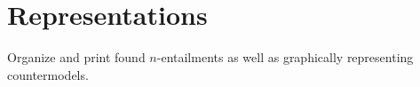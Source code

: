 \documentclass[a4paper, 11pt]{article} %
\newcommand{\tuple}[1]{\langle#1\rangle} %
\newcommand{\set}[1]{\lbrace#1\rbrace} %
\begin{document}





\section{Representations}

Organize and print found $n$-entailments as well as graphically representing countermodels.







%
\end{document}
